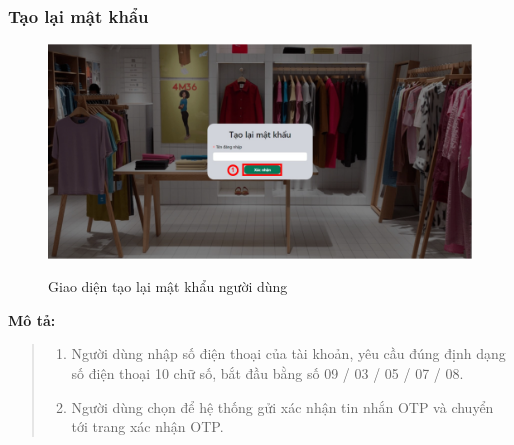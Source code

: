 \subsubsection{Tạo lại mật khẩu}
\begin{figure}[!htp]
    \centering
    \includegraphics[width=5in]{img/UI/new_customer/reset_password.png}
    \label{3}
    \newline
    \caption{Giao diện tạo lại mật khẩu người dùng}
\end{figure}
\textbf{Mô tả:}
\begin{quote}
    \begin{enumerate}
        \item Người dùng nhập số điện thoại của tài khoản, yêu cầu đúng định dạng số điện thoại 10 chữ số, bắt đầu bằng số 09 / 03 / 05 / 07 / 08.
        \item Người dùng chọn để hệ thống gửi xác nhận tin nhắn OTP và chuyển tới trang xác nhận OTP.
    \end{enumerate}
\end{quote}


